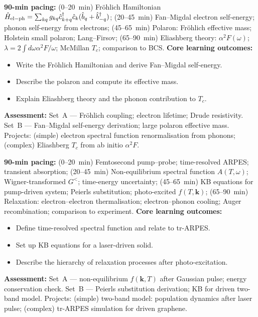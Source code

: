 \documentclass[11pt,a4paper]{article}
\begin{document}
\medskip

\begin{tcolorbox}[modulebox, title={Module~II.5 --- Lecture L09: Electron--Phonon Coupling}]
\textbf{90-min pacing:} (0--20~min) Fr\"ohlich Hamiltonian $\hat{H}_{\rm el-ph}=\sum_{kq}g_{kq}\hat{c}^\dagger_{k+q}\hat{c}_k(\hat{b}_q+\hat{b}^\dagger_{-q})$; (20--45~min) Fan--Migdal electron self-energy; phonon self-energy from electrons; (45--65~min) Polaron: Fr\"ohlich effective mass; Holstein small polaron; Lang--Firsov; (65--90~min) Eliashberg theory: $\alpha^2F(\omega)$; $\lambda=2\int d\omega\alpha^2F/\omega$; McMillan $T_c$; comparison to BCS.
\medskip\textbf{Core learning outcomes:}
\begin{itemize}[leftmargin=1.4em,topsep=2pt,itemsep=1pt]
  \item Write the Fr\"ohlich Hamiltonian and derive Fan--Migdal self-energy.
  \item Describe the polaron and compute its effective mass.
  \item Explain Eliashberg theory and the phonon contribution to $T_c$.
\end{itemize}
\medskip\textbf{Assessment:}
Set~A --- Fr\"ohlich coupling; electron lifetime; Drude resistivity.
Set~B --- Fan--Migdal self-energy derivation; large polaron effective mass.
Projects: (simple) electron spectral function renormalisation from phonons; (complex) Eliashberg $T_c$ from ab initio $\alpha^2F$.
\end{tcolorbox}

\medskip

\begin{tcolorbox}[modulebox, title={Module~II.5 --- Lecture L10: Pump--Probe Dynamics}]
\textbf{90-min pacing:} (0--20~min) Femtosecond pump--probe; time-resolved ARPES; transient absorption; (20--45~min) Non-equilibrium spectral function $A(T,\omega)$; Wigner-transformed $G^<$; time-energy uncertainty; (45--65~min) KB equations for pump-driven system; Peierls substitution; photo-excited $f(T,\mathbf{k})$; (65--90~min) Relaxation: electron--electron thermalisation; electron--phonon cooling; Auger recombination; comparison to experiment.
\medskip\textbf{Core learning outcomes:}
\begin{itemize}[leftmargin=1.4em,topsep=2pt,itemsep=1pt]
  \item Define time-resolved spectral function and relate to tr-ARPES.
  \item Set up KB equations for a laser-driven solid.
  \item Describe the hierarchy of relaxation processes after photo-excitation.
\end{itemize}
\medskip\textbf{Assessment:}
Set~A --- non-equilibrium $f(\mathbf{k},T)$ after Gaussian pulse; energy conservation check.
Set~B --- Peierls substitution derivation; KB for driven two-band model.
Projects: (simple) two-band model: population dynamics after laser pulse; (complex) tr-ARPES simulation for driven graphene.
\end{tcolorbox}
\end{document}
